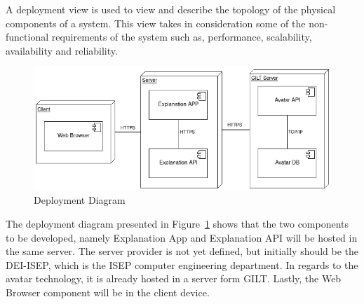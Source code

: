 A deployment view is used to view and describe the topology of the physical components of a system.
This view takes in consideration some of the non-functional requirements of the system such as, performance, scalability, availability and reliability.

\begin{figure}[H]
\centering
\includegraphics[width=\textwidth,keepaspectratio]{ch4/assets/deployment_diagram.png}
\caption[Deployment Diagram]{Deployment Diagram}
\label{fig:deploy}
\end{figure}

The deployment diagram presented in Figure~\ref{fig:deploy} shows that the two components to be developed, namely Explanation App and Explanation API will be hosted in the same server.
The server provider is not yet defined, but initially should be the DEI-ISEP, which is the ISEP computer engineering department.
In regards to the avatar technology, it is already hosted in a server form GILT.
Lastly, the Web Browser component will be in the client device.
